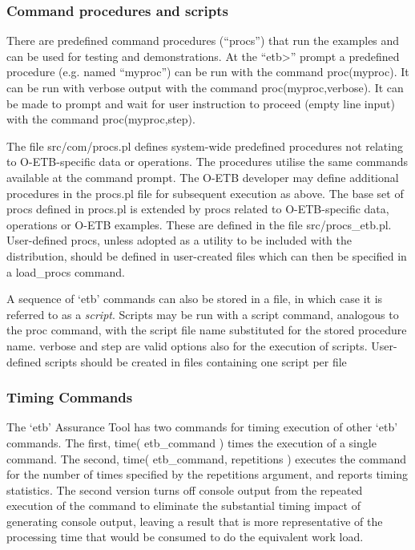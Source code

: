 \documentclass[12pt,twoside,a4paper]{article}
\begin{document}
\hypertarget{command-procedures-and-scripts}{%
\subsubsection{Command procedures and scripts}\label{command-procedures-and-scripts}}

There are predefined command procedures (``procs'') that run the examples and can be used for testing and demonstrations. At the ``etb\textgreater'' prompt a predefined procedure (e.g. named ``myproc'') can be run with the command proc(myproc). It can be run with verbose output with the command proc(myproc,verbose). It can be made to prompt and wait for user instruction to proceed (empty line input) with the command proc(myproc,step).

The file src/com/procs.pl defines system-wide predefined procedures not relating to O-ETB-specific data or operations. The procedures utilise the same commands available at the command prompt. The O-ETB developer may define additional procedures in the procs.pl file for subsequent execution as above. The base set of procs defined in procs.pl is extended by procs related to O-ETB-specific data, operations or O-ETB examples. These are defined in the file src/procs\_etb.pl. User-defined procs, unless adopted as a utility to be included with the distribution, should be defined in user-created files which can then be specified in a load\_procs command.

A sequence of `etb' commands can also be stored in a file, in which case it is referred to as a \emph{script}. Scripts may be run with a script command, analogous to the proc command, with the script file name substituted for the stored procedure name. verbose and step are valid options also for the execution of scripts. User-defined scripts should be created in files containing one script per file

\hypertarget{timing-commands}{%
\subsubsection{Timing Commands}\label{timing-commands}}

The `etb' Assurance Tool has two commands for timing execution of other `etb' commands. The first, time( etb\_command ) times the execution of a single command. The second, time( etb\_command, repetitions ) executes the command for the number of times specified by the repetitions argument, and reports timing statistics. The second version turns off console output from the repeated execution of the command to eliminate the substantial timing impact of generating console output, leaving a result that is more representative of the processing time that would be consumed to do the equivalent work load.
\end{document}
